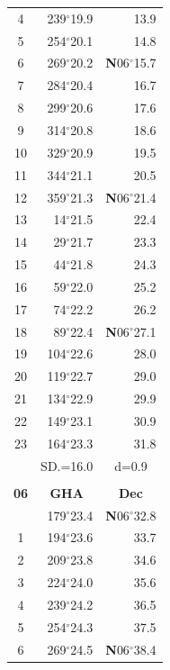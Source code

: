 \documentclass[10pt, a4paper]{report}
\begin{document}
\begin{scriptsize}
\begin{tabular*}{0.2\textwidth}[t]{@{\extracolsep{\fill}}|c|rr|}
4 & 239$^\circ$19.9 & 13.9\\
5 & 254$^\circ$20.1 & 14.8\\[2Pt]
6 & 269$^\circ$20.2 & \textbf{N}06$^\circ$15.7\\
7 & 284$^\circ$20.4 & 16.7\\
8 & 299$^\circ$20.6 & 17.6\\
9 & 314$^\circ$20.8 & \raisebox{0.24ex}{\boldmath$\cdot$~\boldmath$\cdot$~~}18.6\\
10 & 329$^\circ$20.9 & 19.5\\
11 & 344$^\circ$21.1 & 20.5\\[2Pt]
12 & 359$^\circ$21.3 & \textbf{N}06$^\circ$21.4\\
13 & 14$^\circ$21.5 & 22.4\\
14 & 29$^\circ$21.7 & 23.3\\
15 & 44$^\circ$21.8 & \raisebox{0.24ex}{\boldmath$\cdot$~\boldmath$\cdot$~~}24.3\\
16 & 59$^\circ$22.0 & 25.2\\
17 & 74$^\circ$22.2 & 26.2\\[2Pt]
18 & 89$^\circ$22.4 & \textbf{N}06$^\circ$27.1\\
19 & 104$^\circ$22.6 & 28.0\\
20 & 119$^\circ$22.7 & 29.0\\
21 & 134$^\circ$22.9 & \raisebox{0.24ex}{\boldmath$\cdot$~\boldmath$\cdot$~~}29.9\\
22 & 149$^\circ$23.1 & 30.9\\
23 & 164$^\circ$23.3 & 31.8\\
\hline
\rule{0pt}{2.4ex} & \multicolumn{1}{c}{SD.=16.0} & \multicolumn{1}{c|}{d=0.9}\\
\hline
\multicolumn{1}{c}{}\\[-0.5ex]\hline
\multicolumn{1}{|c|}{\rule{0pt}{2.6ex}\textbf{06}} & \multicolumn{1}{c}{\textbf{GHA}} & \multicolumn{1}{c|}{\textbf{Dec}}\\
\hline\rule{0pt}{2.6ex}\noindent
0 & 179$^\circ$23.4 & \textbf{N}06$^\circ$32.8\\
1 & 194$^\circ$23.6 & 33.7\\
2 & 209$^\circ$23.8 & 34.6\\
3 & 224$^\circ$24.0 & \raisebox{0.24ex}{\boldmath$\cdot$~\boldmath$\cdot$~~}35.6\\
4 & 239$^\circ$24.2 & 36.5\\
5 & 254$^\circ$24.3 & 37.5\\[2Pt]
6 & 269$^\circ$24.5 & \textbf{N}06$^\circ$38.4\\

\end{tabular*}
\end{scriptsize}
\end{document}
